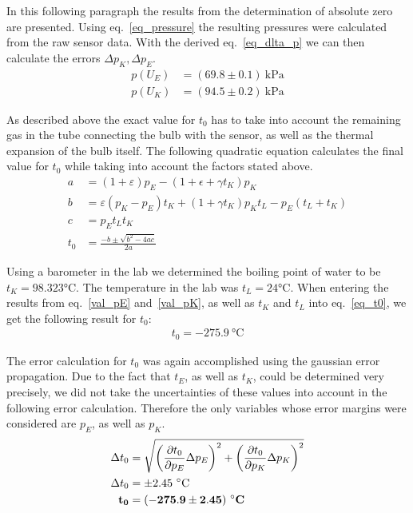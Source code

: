     In this following paragraph the results from the determination of absolute zero are presented.
    Using eq.~\ref{eq_pressure} the resulting pressures were calculated from the raw sensor data.
    With the derived eq.~\ref{eq_dlta_p} we can then calculate the errors $\Delta p_K, \Delta p_E$. %
    \begin{align}
        p(U_E) &= (69.8 \pm 0.1) ~\si{\kilo\pascal} \label{val_pE}\\
        p(U_K) &= (94.5 \pm 0.2) ~\si{\kilo\pascal} \label{val_pK}
    \end{align}

    As described above the exact value for $t_0$ has to take into account the remaining gas
    in the tube connecting the bulb with the sensor, as well as the thermal expansion of the
    bulb itself. The following quadratic equation calculates the final value for $t_0$ while
    taking into account the factors stated above.
    \begin{align}
        a &= (1 + \varepsilon)p_E - (1 + \epsilon + \gamma t_K)p_K\\
        b &= \varepsilon(p_K - p_E)t_K + (1 + \gamma t_K)p_K t_L - p_E(t_L + t_K)\\
        c &= p_E t_L t_K\\
        t_0 &= \frac{-b \pm \sqrt{b^2 - 4a c}}{2a} \label{eq_t0}
    \end{align}

    Using a barometer in the lab we determined the boiling point of water to be $t_K = 98.323 \si{\celsius}$.
    The temperature in the lab was $t_L = 24 \si{\celsius}$.
    When entering the results from eq.~\ref{val_pE} and~\ref{val_pK}, as well as $t_K$ and $t_L$ into eq.~\ref{eq_t0},
    we get the following result for $t_0$:
    \begin{align}
        t_0 = -275.9~\si{\celsius} \label{val_t0}
    \end{align}

    The error calculation for $t_0$ was again accomplished using the gaussian error propagation.
    Due to the fact that $t_E$, as well as $t_K$, could be determined very precisely, we did not take
    the uncertainties of these values into account in the following error calculation.
    Therefore the only variables whose error margins were considered are $p_E$, as well as $p_K$. %
    \begin{align}
        \Delta t_0 &= \sqrt{ \left(\frac{\partial t_0}{\partial p_E} \Delta p_E \right)^2 +
                            \left(\frac{\partial t_0}{\partial p_K} \Delta p_K \right)^2 }\\
        \Delta t_0 &= \pm 2.45~\si{\celsius} \label{dlta_t0}\\
        \bf t_0 &= \bf (-275.9 \pm 2.45)~\si{\bf\celsius} \label{res_t0}
    \end{align}

